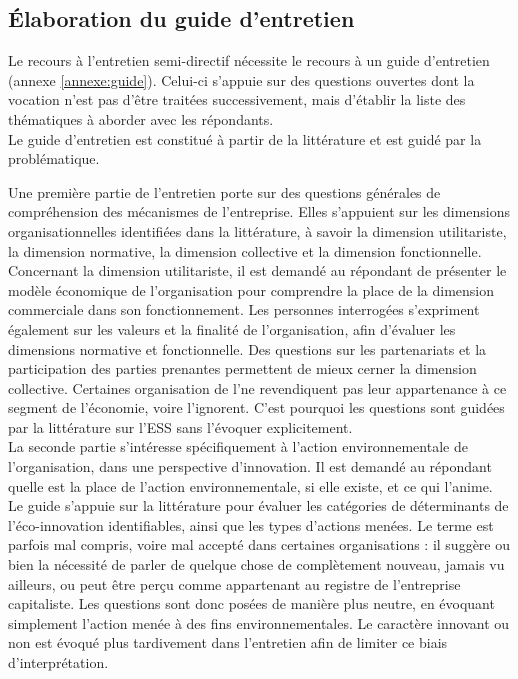 \subsection{Élaboration du guide d’entretien}

    Le recours à l'entretien semi-directif nécessite le recours à un guide d'entretien (annexe \ref{annexe:guide}). Celui-ci s'appuie sur des questions ouvertes dont la vocation n'est pas d'être traitées successivement, mais d'établir la liste des thématiques à aborder avec les répondants. \\

    Le guide d'entretien est constitué à partir de la littérature et est guidé par la problématique.

    Une première partie de l'entretien porte sur des questions générales de compréhension des mécanismes de l'entreprise. Elles s'appuient sur les dimensions organisationnelles identifiées dans la littérature, à savoir la dimension utilitariste, la dimension normative, la dimension collective et la dimension fonctionnelle. Concernant la dimension utilitariste, il est demandé au répondant de présenter le modèle économique de l'organisation pour comprendre la place de la dimension commerciale dans son fonctionnement. Les personnes interrogées s'expriment également sur les valeurs et la finalité de l'organisation, afin d'évaluer les dimensions normative et fonctionnelle. Des questions sur les partenariats et la participation des parties prenantes permettent de mieux cerner la dimension collective. Certaines organisation de l'\ess ne revendiquent pas leur appartenance à ce segment de l'économie, voire l'ignorent. C'est pourquoi les questions sont guidées par la littérature sur l'ESS sans l'évoquer explicitement. \\

    La seconde partie s'intéresse spécifiquement à l'action environnementale de l'organisation, dans une perspective d'innovation. Il est demandé au répondant quelle est la place de l'action environnementale, si elle existe, et ce qui l'anime. Le guide s'appuie sur la littérature pour évaluer les catégories de déterminants de l'éco-innovation identifiables, ainsi que les types d'actions menées. Le terme  est parfois mal compris, voire mal accepté dans certaines organisations : il suggère ou bien la nécessité de parler de quelque chose de complètement nouveau, jamais vu ailleurs, ou peut être perçu comme appartenant au registre de l'entreprise capitaliste. Les questions sont donc posées de manière plus neutre, en évoquant simplement l'action menée à des fins environnementales. Le caractère innovant ou non est évoqué plus tardivement dans l'entretien afin de limiter ce biais d'interprétation. \\

